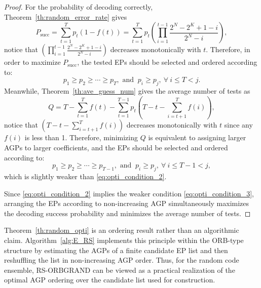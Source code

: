 \documentclass[letterpaper,draftclsnofoot,onecolumn]{IEEEtran}
\begin{document}
\begin{proof}
    For the probability of decoding correctly, Theorem~\ref{th:random_error_rate} gives
     \begin{equation}\label{eq:prob_succ}
         P_{\text{succ}} = \sum_{t=1}^{T}p_t(1 - f(t)) = \sum_{t=1}^{T}p_t \left(\prod_{i=1}^{t-1}\frac{2^N-2^K+1-i}{2^N-i}\right),
     \end{equation}
     notice that $\left(\prod_{i=1}^{t-1}\frac{2^N-2^K+1-i}{2^N-i}\right)$ decreases monotonically with $t$. Therefore, in order to maximize $P_{\text{succ}}$, the tested EPs should be selected and ordered according to:
     \begin{equation}\label{eq:opti_condition_2}
        p_1\geq p_2\geq \cdots\geq p_T, \text{ and }\ p_i\geq p_j,\ \forall\ i\leq T<j.
     \end{equation}
     Meanwhile, Theorem~\ref{th:ave_guess_num} gives the average number of tests as
     \begin{equation}
         Q = T- \sum_{t=1}^{T} f(t) - \sum_{t=1}^{T-1}p_t\left(T -t - \sum_{i=t+1} ^{T}f(i)\right),
     \end{equation}
     notice that $\left(T -t - \sum_{i=t+1}^{T}f(i)\right)$ decreases monotonically with $t$ since any $f(i)$ is less than 1. Therefore, minimizing $Q$ is equivalent to assigning larger AGPs to larger coefficients, and the EPs should be selected and ordered according to:
     \begin{equation}\label{eq:opti_condition_3}
         p_1\geq p_2\geq \cdots\geq p_{T-1}, \text{ and }\ p_i\geq p_j,\ \forall\ i\leq T-1<j,
     \end{equation}
     which is slightly weaker than \eqref{eq:opti_condition_2}.

     Since \eqref{eq:opti_condition_2} implies the weaker condition \eqref{eq:opti_condition_3}, arranging the EPs according to non-increasing AGP simultaneously maximizes the decoding success probability and minimizes the average number of tests.

\end{proof}

Theorem~\ref{th:random_opti} is an ordering result rather than an algorithmic claim. Algorithm~\ref{alg:E_RS} implements this principle within the ORB-type structure by estimating the AGPs of a finite candidate EP list and then reshuffling the list in non-increasing AGP order. Thus, for the random code ensemble, RS-ORBGRAND can be viewed as a practical realization of the optimal AGP ordering over the candidate list used for construction.
\end{document}
